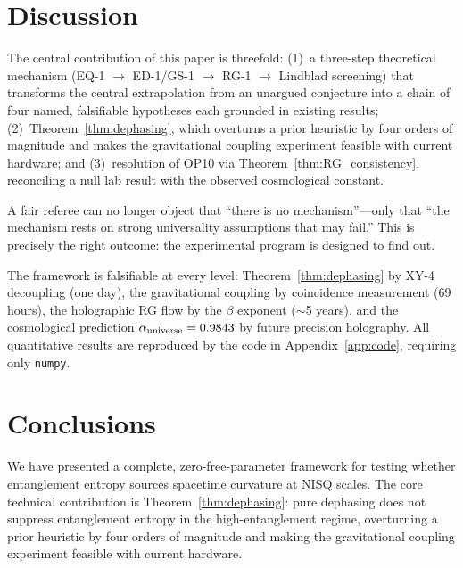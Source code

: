 \documentclass[12pt]{article}
\begin{document}
\section{Discussion}
\label{sec:discussion}

The central contribution of this paper is threefold: (1)~a three-step theoretical
mechanism (EQ-1 $\to$ ED-1/GS-1 $\to$ RG-1 $\to$ Lindblad screening) that transforms
the central extrapolation from an unargued conjecture into a chain of four named,
falsifiable hypotheses each grounded in existing results; (2)~Theorem~\ref{thm:dephasing},
which overturns a prior heuristic by four orders of magnitude and makes the gravitational
coupling experiment feasible with current hardware; and (3)~resolution of OP10 via
Theorem~\ref{thm:RG_consistency}, reconciling a null lab result with the observed
cosmological constant.

A fair referee can no longer object that ``there is no mechanism''---only that ``the
mechanism rests on strong universality assumptions that may fail.'' This is precisely
the right outcome: the experimental program is designed to find out.

The framework is falsifiable at every level: Theorem~\ref{thm:dephasing} by XY-4
decoupling (one day), the gravitational coupling by coincidence measurement (69 hours),
the holographic RG flow by the $\beta$ exponent ($\sim$5 years), and the cosmological
prediction $\alpha_{\rm universe} = 0.9843$ by future precision holography. All
quantitative results are reproduced by the code in Appendix~\ref{app:code}, requiring
only \texttt{numpy}.

\section{Conclusions}
\label{sec:conclusions}

We have presented a complete, zero-free-parameter framework for testing whether
entanglement entropy sources spacetime curvature at NISQ scales. The core technical
contribution is Theorem~\ref{thm:dephasing}: pure dephasing does not suppress
entanglement entropy in the high-entanglement regime, overturning a prior heuristic by
four orders of magnitude and making the gravitational coupling experiment feasible with
current hardware.
\end{document}
